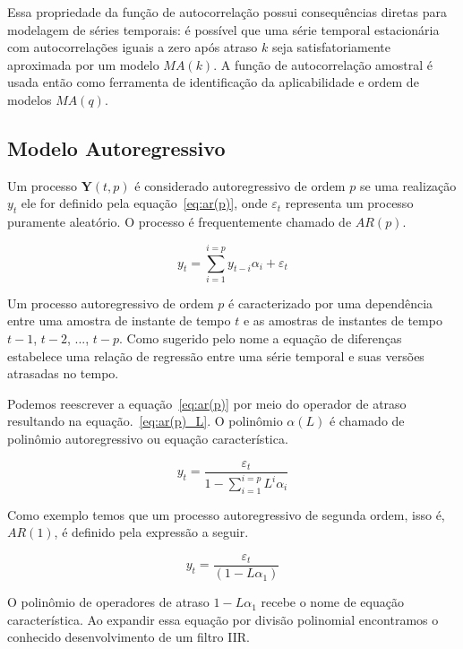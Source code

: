Essa propriedade da função de autocorrelação possui consequências diretas para
modelagem de séries temporais: é possível que uma série temporal estacionária
com autocorrelações iguais a zero após atraso $k$ seja satisfatoriamente
aproximada por um modelo $MA(k)$. A função de autocorrelação amostral é usada
então como ferramenta de identificação da aplicabilidade e ordem de modelos
$MA(q)$.

\subsection{Modelo Autoregressivo}
\label{ssec:AR(p)}

Um processo ${\mathbf{Y}(t, p)}$ é considerado autoregressivo de ordem $p$ se
uma realização $y_t$ ele for definido pela equação~\ref{eq:ar(p)}, onde
$\varepsilon_t$ representa um processo puramente aleatório. O processo é
frequentemente chamado de $AR(p)$.

\begin{equation}\label{eq:ar(p)}
   y_t = \sum^{i=p}_{i=1} y_{t-i} \alpha_i + \varepsilon_t
\end{equation}

Um processo autoregressivo de ordem $p$ é caracterizado por uma dependência
entre uma amostra de instante de tempo $t$ e as amostras de instantes de tempo
$t-1$, $t-2$, ..., $t-p$. Como sugerido pelo nome a equação de diferenças
estabelece uma relação de regressão entre uma série temporal e suas versões
atrasadas no tempo.

Podemos reescrever a equação~\ref{eq:ar(p)} por meio do operador de atraso
resultando na equação.~\ref{eq:ar(p)_L}. O polinômio $\alpha(L)$ é chamado de
polinômio autoregressivo ou equação característica.

\begin{equation}\label{eq:ar(p)_L}
    y_t = \frac{\varepsilon_t}{1 - \sum_{i=1}^{i=p} L^i \alpha_i}
\end{equation}

Como exemplo temos que um processo autoregressivo de segunda ordem, isso é,
$AR(1)$, é definido pela expressão a seguir.

\begin{equation}\label{eq:ar_1}
    y_t = \frac{\varepsilon_t}{(1 - L\alpha_1)}
\end{equation}

O polinômio de operadores de atraso $1 - L\alpha_1$ recebe o nome de equação
característica. Ao expandir essa equação por divisão polinomial encontramos o
conhecido desenvolvimento de um filtro IIR.

